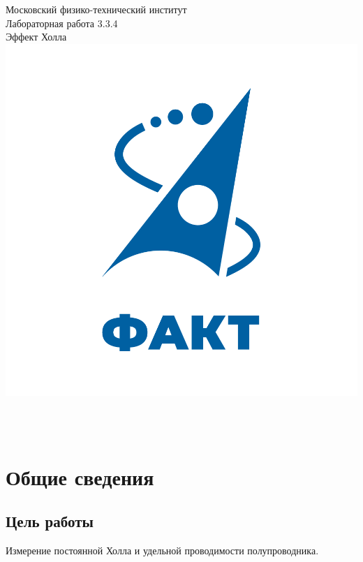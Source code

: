 \documentclass [a4paper,12pt]{article}
\begin{document}
\begin{titlepage}
\begin{center}
	\large{Московский физико-технический институт}\\
	\vspace{100px}
	\LARGE{Лабораторная работа 3.3.4}\\
	\LARGE{Эффект Холла}\\
	\vspace{30px}
	\includegraphics[scale = 0.3]{fakt_logo.png}\\
\end{center}

\vfill
\begin{flushright}
	\\
	\\
\end{flushright}
\end{titlepage}

\newpage

\tableofcontents

\section{Общие сведения}
\subsection{Цель работы}
Измерение постоянной Холла и удельной проводимости полупроводника.
\end{document}
